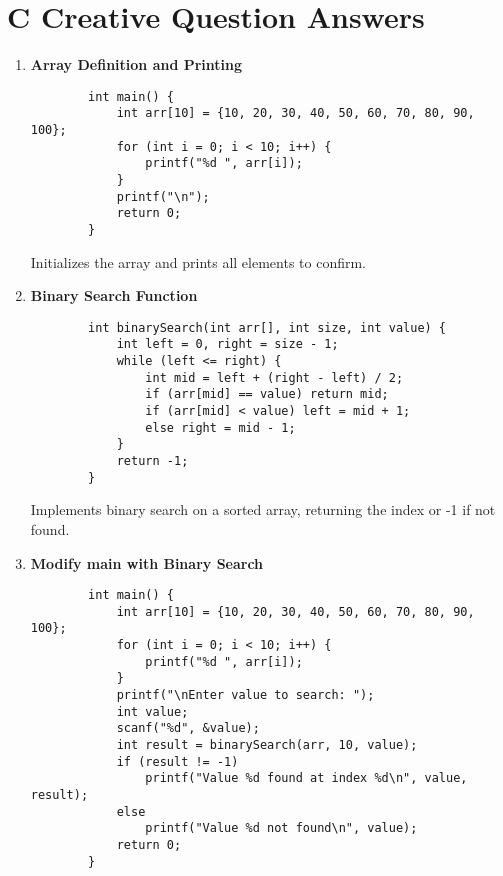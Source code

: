 \documentclass[a4paper,12pt]{article}
\begin{document}
\section{C Creative Question Answers}

\begin{enumerate}
    \item \textbf{Array Definition and Printing}

    \lstset{language=C}
    \begin{lstlisting}
        int main() {
            int arr[10] = {10, 20, 30, 40, 50, 60, 70, 80, 90, 100};
            for (int i = 0; i < 10; i++) {
                printf("%d ", arr[i]);
            }
            printf("\n");
            return 0;
        }
    \end{lstlisting}

    Initializes the array and prints all elements to confirm.

    \item \textbf{Binary Search Function}

    \lstset{language=C}
    \begin{lstlisting}
        int binarySearch(int arr[], int size, int value) {
            int left = 0, right = size - 1;
            while (left <= right) {
                int mid = left + (right - left) / 2;
                if (arr[mid] == value) return mid;
                if (arr[mid] < value) left = mid + 1;
                else right = mid - 1;
            }
            return -1;
        }
    \end{lstlisting}

    Implements binary search on a sorted array, returning the index or -1 if not found.

    \item \textbf{Modify main with Binary Search}

    \lstset{language=C}
    \begin{lstlisting}
        int main() {
            int arr[10] = {10, 20, 30, 40, 50, 60, 70, 80, 90, 100};
            for (int i = 0; i < 10; i++) {
                printf("%d ", arr[i]);
            }
            printf("\nEnter value to search: ");
            int value;
            scanf("%d", &value);
            int result = binarySearch(arr, 10, value);
            if (result != -1)
                printf("Value %d found at index %d\n", value, result);
            else
                printf("Value %d not found\n", value);
            return 0;
        }
    \end{lstlisting}


\end{enumerate}
\end{document}

